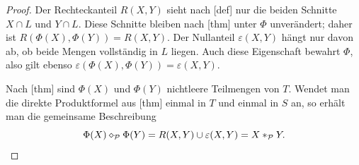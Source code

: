\documentclass[main.tex]{subfiles}
\begin{document}
\begin{proof}
Der Rechteckanteil \(R(X,Y)\) sieht nach
[def] nur die beiden Schnitte
\(X\cap L\) und \(Y\cap L\). Diese Schnitte bleiben nach
[thm] unter \(\Phi\)
unverändert; daher ist
\(R(\Phi(X),\Phi(Y))=R(X,Y)\). Der Nullanteil
\(\varepsilon(X,Y)\) hängt nur davon ab, ob beide Mengen vollständig in
\(L\) liegen. Auch diese Eigenschaft bewahrt \(\Phi\), also gilt ebenso
\(\varepsilon(\Phi(X),\Phi(Y))=\varepsilon(X,Y)\).

Nach [thm] sind
\(\Phi(X)\) und \(\Phi(Y)\) nichtleere Teilmengen von \(T\). Wendet man
die direkte Produktformel aus
[thm] einmal
in \(T\) und einmal in \(S\) an, so erhält man die gemeinsame Beschreibung
\[
  \Phi(X)\mathbin{\diamond}_{\mathcal P}\Phi(Y)
  =R(X,Y)\cup\varepsilon(X,Y)
  =X\mathbin{\ast}_{\mathcal P}Y.
\]
\end{proof}
\end{document}
